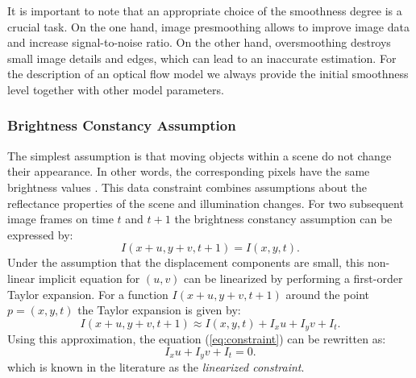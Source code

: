 It is important to note that an appropriate choice of the smoothness degree is a crucial task. On the one hand, image presmoothing allows to improve image data and increase signal-to-noise ratio. On the other hand, oversmoothing destroys small image details and edges, which can lead to an inaccurate \opticalflow estimation. For the description of an optical flow model we always provide the initial smoothness level together with other model parameters.

%  



\subsubsection{Brightness Constancy Assumption}
\label{brightness_constancy_assumption}

The simplest assumption is that moving objects within a scene do not change their appearance. In other words, the corresponding pixels have the same brightness values \cite{LucasKanade81, HornSchunck81}. This data constraint combines assumptions about the reflectance properties of the scene and illumination changes. For two subsequent image frames on time $t$ and $t+1$ the brightness constancy assumption can be expressed by:
\begin{equation}
I(x+u, y+v, t+1) = I(x,y,t).
\label{eq:constraint}	
\end{equation}
Under the assumption that the displacement components are small, this non-linear implicit equation for $(u,v)$ can be linearized by performing a first-order Taylor expansion. For a function $I(x+u, y+v, t+1)$ around the point $p = (x, y, t)$ the Taylor expansion is given by:
$$I(x+u, y+v, t+1) \approx I(x,y,t) + I_{x}u + I_{y}v +I_{t}.$$
Using this approximation, the equation (\ref{eq:constraint}) can be rewritten as:
\begin{equation}
I_{x}u + I_{y}v +I_{t} = 0.
\label{eq:constraint2}	
\end{equation}
which is known in the literature as the \textit{linearized \opticalflow constraint}.

